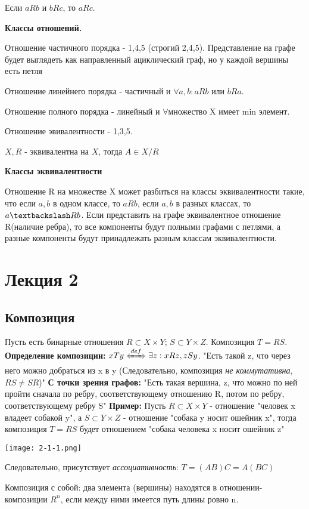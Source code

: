 \documentclass{article}
\newcommand{\defLeftrightarrow}{\xLeftrightarrow{def}}
\begin{document}
Если $aRb$ и $bRc$, то $aRc$.

\textbf{Классы отношений.}

Отношение частичного порядка - 1,4,5 (строгий 2,4,5). Представление на графе будет выглядеть как направленный ациклический граф, но у каждой вершины есть петля

Отношение линейнего порядка - частичный и $\forall a,b: aRb$ или $bRa$.

Отношение полного порядка - линейный и $\forall $множество X имеет min элемент.

Отношение эвивалентности - 1,3,5.

$X,R$ - эквивалентна на $X$, тогда $A\in X /R$

\textbf{Классы эквивалентности}

Отношение R на множестве X может разбиться на классы эквивалентности такие, что если $a, b$ в одном классе, то  $aRb$, если $a, b$ в разных классах, то $a\textbackslash Rb$. Если представить на графе эквивалентное отношение R(наличие ребра), то все компоненты будут полными графами с петлями, а разные компоненты будут принадлежать разным классам эквивалентности.

\section{Лекция 2}
\subsection{Композиция}
Пусть есть бинарные отношения $ R \subset X \times Y $; $ S \subset Y \times Z $.
Композиция $T = RS$. 
\textbf{Определение композиции:} 
$ xTy \defLeftrightarrow \exists z : xRz, zSy$.
"Есть такой z, что через него можно добраться из x в y (Следовательно, композиция \textit{не коммутативна}, $ RS \neq SR $)"
\textbf{С точки зрения графов:}
"Есть такая вершина, z, что можно по ней пройти сначала по ребру, соответствующему отношению R, потом по ребру, соответствующему ребру S"
\textbf{Пример:} 
Пусть $ R \subset X\times Y$ - отношение "человек x владеет собакой y", а $ S \subset Y\times Z$ - отношение "собака y носит ошейник x", тогда композиция $T=RS$ будет отношением "собака человека x носит ошейник z"
\begin{center}
  \texttt{[image: 2-1-1.png]}
\end{center}
Следовательно, присутствует \textit{ассоциативность}: $ T = (AB)C = A(BC) $

Композиция с собой: два элемента (вершины) находятся в отношении-композиции $ R^{n} $, если между ними имеется путь длины ровно n.
\end{document}
